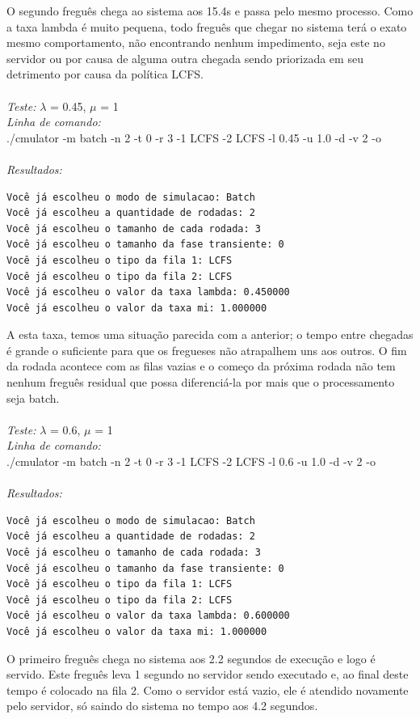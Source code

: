 \documentclass[a4paper,10pt]{article}
\begin{document}
    O segundo freguês chega ao sistema aos 15.4s e passa pelo mesmo processo. Como a taxa lambda é muito pequena, todo freguês que chegar no sistema terá o exato mesmo comportamento, não encontrando nenhum impedimento, seja este no servidor ou por causa de alguma outra chegada sendo priorizada em seu detrimento por causa da política LCFS.
\\
\\
\emph{Teste:} $\lambda$ = 0.45, $\mu$ = 1
\\
\emph{Linha de comando:}
\\
./cmulator -m batch -n 2 -t 0 -r 3 -1 LCFS -2 LCFS -l 0.45 -u 1.0 -d -v 2 -o
\\
\\
\emph{Resultados:}
\\\begin{verbatim}
Você já escolheu o modo de simulacao: Batch
Você já escolheu a quantidade de rodadas: 2
Você já escolheu o tamanho de cada rodada: 3
Você já escolheu o tamanho da fase transiente: 0
Você já escolheu o tipo da fila 1: LCFS
Você já escolheu o tipo da fila 2: LCFS
Você já escolheu o valor da taxa lambda: 0.450000
Você já escolheu o valor da taxa mi: 1.000000
\end{verbatim}
    A esta taxa, temos uma situação parecida com a anterior; o tempo entre chegadas é grande o suficiente para que os fregueses não atrapalhem uns aos outros. O fim da rodada acontece com as filas vazias e o começo da próxima rodada não tem nenhum freguês residual que possa diferenciá-la por mais que o processamento seja batch.
\\
\\
\emph{Teste:} $\lambda$ = 0.6, $\mu$ = 1
\\
\emph{Linha de comando:}
\\
./cmulator -m batch -n 2 -t 0 -r 3 -1 LCFS -2 LCFS -l 0.6 -u 1.0 -d -v 2 -o
\\
\\
\emph{Resultados:}
\begin{verbatim}
Você já escolheu o modo de simulacao: Batch
Você já escolheu a quantidade de rodadas: 2
Você já escolheu o tamanho de cada rodada: 3
Você já escolheu o tamanho da fase transiente: 0
Você já escolheu o tipo da fila 1: LCFS
Você já escolheu o tipo da fila 2: LCFS
Você já escolheu o valor da taxa lambda: 0.600000
Você já escolheu o valor da taxa mi: 1.000000
\end{verbatim}

    O primeiro freguês chega no sistema aos 2.2 segundos de execução e logo é servido. Este freguês leva 1 segundo no servidor sendo executado e, ao final deste tempo é colocado na fila 2. Como o servidor está vazio, ele é atendido novamente pelo servidor, só saindo do sistema no tempo aos 4.2 segundos. 
\end{document}
